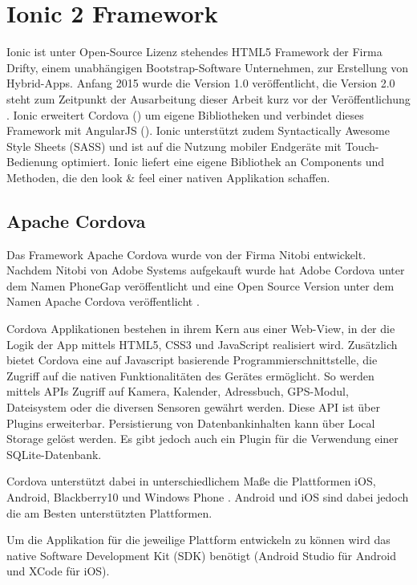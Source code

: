 \chapter{Ionic 2 Framework}
\label{cha:ionic2}
%
Ionic ist unter Open-Source Lizenz stehendes HTML5 Framework der Firma Drifty, einem unabhängigen Bootstrap-Software Unternehmen, zur Erstellung von Hybrid-Apps. Anfang 2015 wurde die Version 1.0 veröffentlicht, die Version 2.0 steht zum Zeitpunkt der Ausarbeitung dieser Arbeit kurz vor der Veröffentlichung \cite{ionic2Anounce}.
Ionic erweitert Cordova () um eigene Bibliotheken und verbindet dieses Framework mit AngularJS (). Ionic unterstützt zudem Syntactically Awesome Style Sheets (SASS) und ist auf die Nutzung mobiler Endgeräte mit Touch-Bedienung optimiert. Ionic liefert eine eigene Bibliothek an Components und Methoden, die den look \& feel einer nativen Applikation schaffen.
%
%
%
%
\section{Apache Cordova}
\label{sec:ApacheCordova}
%
Das Framework Apache Cordova wurde von der Firma Nitobi entwickelt. Nachdem Nitobi von Adobe Systems aufgekauft wurde hat Adobe Cordova unter dem Namen PhoneGap veröffentlicht und eine Open Source Version unter dem Namen Apache Cordova veröffentlicht \cite{adobePhoneGap}.

Cordova Applikationen bestehen in ihrem Kern aus einer Web-View, in der die Logik der App mittels HTML5, CSS3 und JavaScript realisiert wird. 
Zusätzlich bietet Cordova eine auf Javascript basierende Programmierschnittstelle, die Zugriff auf die nativen Funktionalitäten des Gerätes ermöglicht. So werden mittels APIs Zugriff auf Kamera, Kalender, Adressbuch, GPS-Modul, Dateisystem oder die diversen Sensoren gewährt werden. Diese API ist über Plugins erweiterbar. Persistierung von Datenbankinhalten kann über Local Storage gelöst werden. Es gibt jedoch auch ein Plugin für die Verwendung einer SQLite-Datenbank.

Cordova unterstützt dabei in unterschiedlichem Maße die Plattformen iOS, Android, Blackberry10 und Windows Phone \cite{cordovaSupportedPlatforms}. Android und iOS sind dabei jedoch die am Besten unterstützten Plattformen.

Um die Applikation für die jeweilige Plattform entwickeln zu können wird das native Software Development Kit (SDK) benötigt (Android Studio für Android und XCode für iOS).

